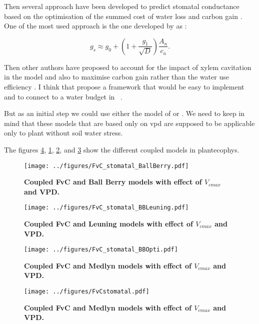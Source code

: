 \documentclass[a4paper,11pt]{article}
\begin{document}
Then several approach have been developed to predict stomatal conductance based on the optimisation of the summed cost of water loss and carbon gain \citep{Medlyn-2002,Prentice-2014,Wolf-2016,Sperry-2017}. One of the most used approach is the one developed by \citet{Medlyn-2011} as :

\begin{equation}
\label{eq:gs-Medlyn}
g_s \approx g_0 + (1 + \frac{g_1}{\sqrt{D}}) \frac{A_n }{c_a}.
\end{equation}


Then other authors have proposed to account for the impact of xylem cavitation \citet{Wolf-2016,Sperry-2016,Sperry-2017} in the model and also to maximise carbon gain rather than the water use efficiency \citet{Wolf-2016}. I think that \citep{Sperry-2016} propose a framework that would be easy to implement and to connect to a water budget in \plant\ .

But as an initial step we could use either the model of \citet{Medlyn-2011} or \citet{Leuning-1995}. We need to keep in mind that these models that are based only on vpd are supposed to be applicable only to plant without soil water stress.

The figures \ref{fig:photo_stomat}, \ref{fig:photo_stomat_BB}, \ref{fig:photo_stomat_Leuning}, and \ref{fig:photo_stomat_opti} show the different coupled models in plantecophys.

\begin{figure}[ht]
\centering
\texttt{[image: ../figures/FvC\_stomatal\_BallBerry.pdf]}
\caption{\textbf{Coupled FvC and Ball Berry models with effect of $V_{cmax}$ and VPD.}
\label{fig:photo_stomat_BB}}
\end{figure}

\begin{figure}[ht]
\centering
\texttt{[image: ../figures/FvC\_stomatal\_BBLeuning.pdf]}
\caption{\textbf{Coupled FvC and Leuning models with effect of $V_{cmax}$ and VPD.}
\label{fig:photo_stomat_Leuning}}
\end{figure}

\begin{figure}[ht]
\centering
\texttt{[image: ../figures/FvC\_stomatal\_BBOpti.pdf]}
\caption{\textbf{Coupled FvC and Medlyn models with effect of $V_{cmax}$ and VPD.}
\label{fig:photo_stomat_opti}}
\end{figure}

\begin{figure}[ht]
\centering
\texttt{[image: ../figures/FvCstomatal.pdf]}
\caption{\textbf{Coupled FvC and Medlyn models with effect of $V_{cmax}$ and VPD.}
\label{fig:photo_stomat}}
\end{figure}
\end{document}
